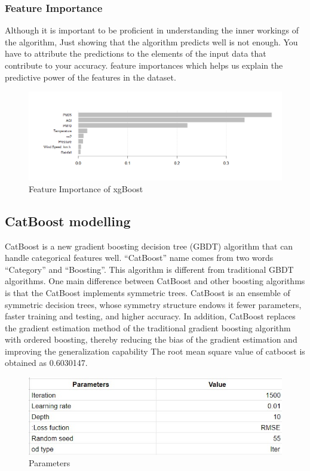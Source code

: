 \subsubsection{Feature Importance}
Although it is important to be proficient in
understanding the inner workings of the
algorithm, Just showing that the algorithm
predicts well is not enough. You have to attribute
the predictions to the elements of the input data
that contribute to your accuracy. feature
importances which helps us explain the predictive
power of the features in the dataset.\par
\begin{figure}[h]
\label{bd}
\centering
\includegraphics[width= 15 cm]{xgbimp.png}
\caption{Feature Importance of xgBoost}
\end{figure}

\subsection{CatBoost modelling}
CatBoost is a new gradient boosting decision tree (GBDT) algorithm that can handle categorical features well. “CatBoost” name comes from two words “Category” and “Boosting”. This algorithm is different from traditional GBDT algorithms. One main difference between CatBoost and other boosting algorithms is that the CatBoost implements symmetric trees.
   CatBoost is an ensemble of symmetric decision trees, whose symmetry structure endows it fewer parameters, faster training and testing, and higher accuracy. In addition, CatBoost replaces the gradient estimation method of the traditional gradient boosting algorithm with ordered boosting, thereby reducing the bias of the gradient estimation and improving the generalization capability
The root mean square value of catboost is obtained as 0.6030147.

\begin{figure}[h]
\label{bd}
\centering
\includegraphics[width= 7 cm]{cat1.jpg}
\caption{Parameters}
\end{figure}

